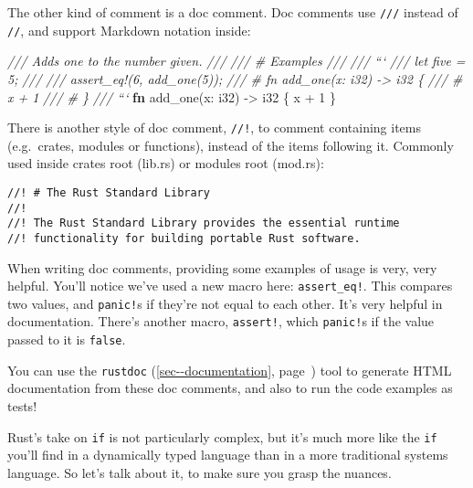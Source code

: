 \documentclass[a4paper,]{book}
\renewcommand*{\hyperref}[2][\ar]{%
  \def\ar{#2}%
  #2 (\autoref{#1}, page~\pageref{#1})}
\newenvironment{Shaded}{\begin{snugshade}}{\end{snugshade}}
\newcommand{\KeywordTok}[1]{\textcolor[rgb]{0.13,0.29,0.53}{\textbf{{#1}}}}
\newcommand{\DataTypeTok}[1]{\textcolor[rgb]{0.13,0.29,0.53}{{#1}}}
\newcommand{\DecValTok}[1]{\textcolor[rgb]{0.00,0.00,0.81}{{#1}}}
\newcommand{\CommentTok}[1]{\textcolor[rgb]{0.56,0.35,0.01}{\textit{{#1}}}}
\newcommand{\NormalTok}[1]{{#1}}
\begin{document}
The other kind of comment is a doc comment. Doc comments use
\texttt{///} instead of \texttt{//}, and support Markdown notation
inside:

\begin{Shaded}
\begin{Highlighting}[]
\CommentTok{/// Adds one to the number given.}
\CommentTok{///}
\CommentTok{/// # Examples}
\CommentTok{///}
\CommentTok{/// ```}
\CommentTok{/// let five = 5;}
\CommentTok{///}
\CommentTok{/// assert_eq!(6, add_one(5));}
\CommentTok{/// # fn add_one(x: i32) -> i32 \{}
\CommentTok{/// #     x + 1}
\CommentTok{/// # \}}
\CommentTok{/// ```}
\KeywordTok{fn} \NormalTok{add_one(x: }\DataTypeTok{i32}\NormalTok{) -> }\DataTypeTok{i32} \NormalTok{\{}
    \NormalTok{x + }\DecValTok{1}
\NormalTok{\}}
\end{Highlighting}
\end{Shaded}

There is another style of doc comment, \texttt{//!}, to comment
containing items (e.g.~crates, modules or functions), instead of the
items following it. Commonly used inside crates root (lib.rs) or modules
root (mod.rs):

\begin{verbatim}
//! # The Rust Standard Library
//!
//! The Rust Standard Library provides the essential runtime
//! functionality for building portable Rust software.
\end{verbatim}

When writing doc comments, providing some examples of usage is very,
very helpful. You'll notice we've used a new macro here:
\texttt{assert\_eq!}. This compares two values, and \texttt{panic!}s if
they're not equal to each other. It's very helpful in documentation.
There's another macro, \texttt{assert!}, which \texttt{panic!}s if the
value passed to it is \texttt{false}.

You can use the \hyperref[sec--documentation]{\texttt{rustdoc}} tool to
generate HTML documentation from these doc comments, and also to run the
code examples as tests!


Rust's take on \texttt{if} is not particularly complex, but it's much
more like the \texttt{if} you'll find in a dynamically typed language
than in a more traditional systems language. So let's talk about it, to
make sure you grasp the nuances.
\end{document}

